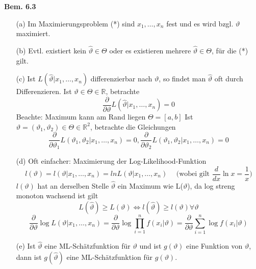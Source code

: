 \documentclass[a4paper,11pt]{article}
\begin{document}
\vspace{6pt}
\noindent\textbf{Bem. 6.3}
\begin{itemize}
\item[(a)] Im Maximierungsproblem (*) sind $x_1,\dots,x_n$ fest und es wird bzgl. $\vartheta$ maximiert.
\item[(b)] Evtl. existiert kein $\hat{\vartheta}\in\Theta$ oder es existieren mehrere $\hat{\vartheta}\in\Theta$, für die (*) gilt. 
\item[(c)] Ist $ L(\hat{\vartheta}|x_1,\dots,x_n)$ differenzierbar nach $\vartheta$, so findet man $\hat{\vartheta}$ oft durch Differenzieren.
Ist $\vartheta\in\Theta\in\mathbb{R}$, betrachte
\[\frac{\partial}{\partial\vartheta}L(\hat{\vartheta}|x_1,\dots,x_n)=0\]
Beachte: Maximum kann am Rand liegen $\Theta = [a,b]$
\newline Ist $\vartheta=(\vartheta_1,\vartheta_2)\in\Theta\in\mathbb{R}^2$, betrachte die Gleichungen
\[\frac{\partial}{\partial\vartheta_1}L(\vartheta_1,\vartheta_2|x_1,\dots,x_n)=0, \frac{\partial}{\partial\vartheta_2}L(\vartheta_1,\vartheta_2|x_1,\dots,x_n)=0\]
\item[(d)] Oft einfacher: 
\newline Maximierung der Log-Likelihood-Funktion
\[l(\vartheta)=l(\vartheta|x_1,\dots,x_n)=ln L(\vartheta|x_1,\dots,x_n) \hspace{15pt}\text{(wobei gilt $\frac{d}{dx}\ln x = \frac{1}{x}$)}\] 
$l(\vartheta)$ hat an derselben Stelle $\hat{\vartheta}$ ein Maximum wie L($\vartheta$), da log streng monoton wachsend ist gilt
\[L(\hat{\vartheta})\geq L(\vartheta) \Leftrightarrow l(\hat{\vartheta})\geq l(\vartheta) \forall\vartheta\]
\[\frac{\partial}{\partial\vartheta}\log L(\vartheta|x_1,\dots,x_n)=\frac{\partial}{\partial\vartheta}\log\prod_{i=1}^{n}f(x_i|\vartheta)=\frac{\partial}{\partial\vartheta}\sum_{i=1}^{n}\log f(x_i|\vartheta)\]
\item[(e)] Ist $\hat{\vartheta}$ eine ML-Schätzfunktion für $\vartheta$ und ist $g(\vartheta)$ eine Funktion von $\vartheta$, dann ist $g(\hat{\vartheta})$ eine ML-Schätzfunktion für $g(\vartheta)$. 
\end{itemize}
\end{document}
